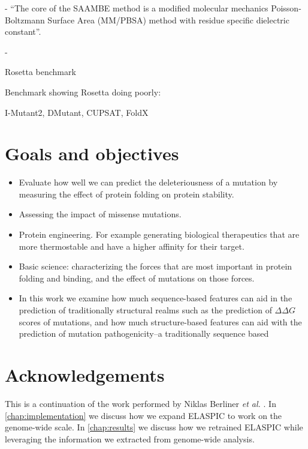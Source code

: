   - ``The core of the SAAMBE method is a modified molecular mechanics Poisson-Boltzmann Surface Area (MM/PBSA) method with residue specific dielectric constant''.

  - \cite{petukh_predicting_2015}




Rosetta benchmark \cite{o_conchuir_web_2015}

Benchmark showing Rosetta doing poorly: \cite{potapov_assessing_2009}

I-Mutant2, DMutant, CUPSAT, FoldX \cite{khan_performance_2010}



\section{Goals and objectives}

\begin{itemize}
    \item Evaluate how well we can predict the deleteriousness of a mutation by measuring the effect of protein folding on protein stability.
    \item Assessing the impact of missense mutations.
    \item Protein engineering. For example generating biological therapeutics that are more thermostable and have a higher affinity for their target.
    \item Basic science: characterizing the forces that are most important in protein folding and binding, and the effect of mutations on those forces.
    \item In this work we examine how much sequence-based features can aid in the prediction of traditionally structural realms such as the prediction of $\Delta \Delta G$ scores of mutations, and how much structure-based features can aid with the prediction of mutation pathogenicity--a traditionally sequence based
\end{itemize}







\section{Acknowledgements}

This is a continuation of the work performed by Niklas Berliner \textit{et al.} \cite{berliner_combining_2014}. In \ref{chap:implementation} we discuss how we expand ELASPIC to work on the genome-wide scale. In \ref{chap:results} we discuss how we retrained ELASPIC while leveraging the information we extracted from genome-wide analysis.
